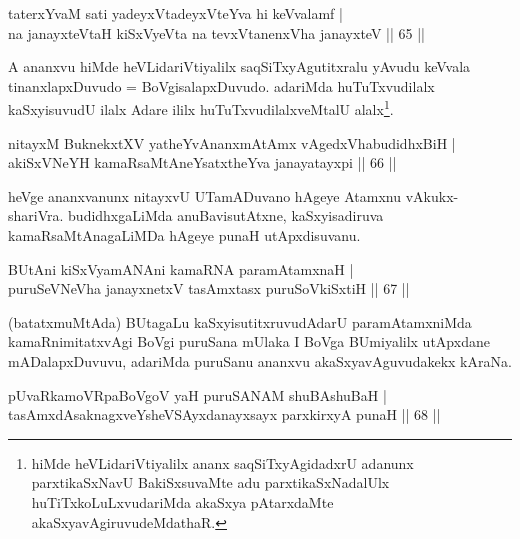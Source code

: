 \begin{shl}
taterxYvaM sati yadeyxVtadeyxVteYva hi keVvalamf |\\
na janayxteV\s taH kiSxVyeVta na tevxVtanenxVha janayxteV \hfill || 65 ||
\end{shl}

\begin{artha}
A ananxvu hiMde heVLidariVtiyalilx saqSiTxyAgutitxralu yAvudu keVvala tinanxlapxDuvudo = BoVgisalapxDuvudo. adariMda huTuTxvudilalx kaSxyisuvudU ilalx Adare ililx huTuTxvudilalxveMtalU alalx\footnote{hiMde heVLidariVtiyalilx ananx saqSiTxyAgidadxrU adanunx parxtikaSxNavU BakiSxsuvaMte adu parxtikaSxNadalUlx huTiTxkoLuLxvudariMda akaSxya pAtarxdaMte akaSxyavAgiruvudeMdathaR.}.
\end{artha}


\begin{shl}
nitayxM BuknekxtXV yatheYvAnanxmAtAmx vAgedxVhabudidhxBiH |\\
akiSxVNeYH kamaRsaMtAneYsatxtheYva janayatayxpi \hfill || 66 ||
\end{shl}

\begin{artha}
heVge ananxvanunx nitayxvU UTamADuvano hAgeye Atamxnu vAkukx-shariVra. budidhxgaLiMda 
anuBavisutAtxne, kaSxyisadiruva kamaRsaMtAnagaLiMDa hAgeye punaH utApxdisuvanu.
\end{artha}


\begin{shl}
BUtAni kiSxVyamANAni kamaRNA paramAtamxnaH |\\
puruSeVNeVha janayxnetxV tasAmxtasx puruSoV\s kiSxtiH \hfill || 67 ||
\end{shl}

\begin{artha}
(batatxmuMtAda) BUtagaLu kaSxyisutitxruvudAdarU paramAtamxniMda kamaRnimitatxvAgi BoVgi puruSana mUlaka I BoVga BUmiyalilx utApxdane mADalapxDuvuvu, adariMda puruSanu ananxvu akaSxyavAguvudakekx kAraNa.
\end{artha}

\begin{shl}
pUvaRkamoVRpaBoVgoV yaH puruSANAM shuBAshuBaH |\\
tasAmxdAsaknagxveYsheVSAyxdanayxsayx \footnotemark{}parxkirxyA punaH \hfill || 68 ||
\end{shl}

